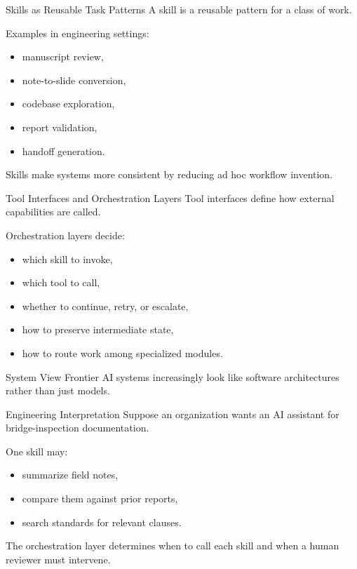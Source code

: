 \documentclass[12pt]{beamer}
\begin{document}
\begin{frame}{Skills as Reusable Task Patterns}
  A skill is a reusable pattern for a class of work.

  Examples in engineering settings:
  \begin{itemize}
    \item manuscript review,
    \item note-to-slide conversion,
    \item codebase exploration,
    \item report validation,
    \item handoff generation.
  \end{itemize}

  Skills make systems more consistent by reducing ad hoc workflow invention.
\end{frame}

\begin{frame}{Tool Interfaces and Orchestration Layers}
  Tool interfaces define how external capabilities are called.

  Orchestration layers decide:
  \begin{itemize}
    \item which skill to invoke,
    \item which tool to call,
    \item whether to continue, retry, or escalate,
    \item how to preserve intermediate state,
    \item how to route work among specialized modules.
  \end{itemize}

  \begin{conceptbox}{System View}
    Frontier AI systems increasingly look like software architectures rather than just models.
  \end{conceptbox}
\end{frame}

\begin{frame}{Engineering Interpretation}
  Suppose an organization wants an AI assistant for bridge-inspection documentation.

  One skill may:
  \begin{itemize}
    \item summarize field notes,
    \item compare them against prior reports,
    \item search standards for relevant clauses.
  \end{itemize}

  The orchestration layer determines when to call each skill and when a human reviewer must intervene.
\end{frame}
\end{document}
